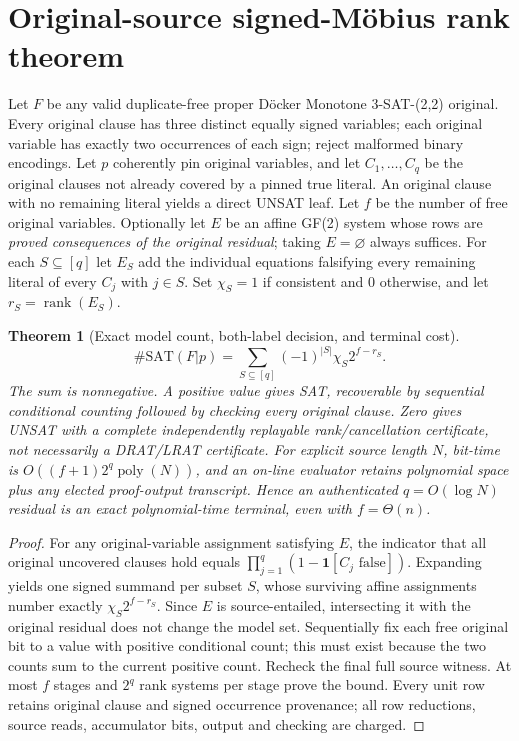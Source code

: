 \documentclass[11pt]{article}
\newtheorem{theorem}{Theorem}
\begin{document}
\section{Original-source signed-M\"obius rank theorem}
Let $F$ be any valid duplicate-free proper D\"ocker Monotone 3-SAT-(2,2) original. Every original clause has three distinct equally signed variables; each original variable has exactly two occurrences of each sign; reject malformed binary encodings. Let $p$ coherently pin original variables, and let $C_1,\dots,C_q$ be the original clauses not already covered by a pinned true literal. An original clause with no remaining literal yields a direct UNSAT leaf. Let $f$ be the number of free original variables. Optionally let $E$ be an affine GF(2) system whose rows are \emph{proved consequences of the original residual}; taking $E=\varnothing$ always suffices. For each $S\subseteq[q]$ let $E_S$ add the individual equations falsifying every remaining literal of every $C_j$ with $j\in S$. Set $\chi_S=1$ if consistent and $0$ otherwise, and let $r_S=\operatorname{rank}(E_S)$.
\begin{theorem}[Exact model count, both-label decision, and terminal cost]
\[
\boxed{\#\mathrm{SAT}(F|p)=\sum_{S\subseteq[q]}(-1)^{|S|}\chi_S2^{f-r_S}.}
\tag{305.1}
\]
The sum is nonnegative. A positive value gives SAT, recoverable by sequential conditional counting followed by checking every original clause. Zero gives UNSAT with a complete independently replayable rank/cancellation certificate, not necessarily a DRAT/LRAT certificate. For explicit source length $N$, bit-time is $O((f+1)2^q\operatorname{poly}(N))$, and an on-line evaluator retains polynomial space plus any elected proof-output transcript. Hence an authenticated $q=O(\log N)$ residual is an exact polynomial-time terminal, even with $f=\Theta(n)$.
\end{theorem}
\begin{proof}
For any original-variable assignment satisfying $E$, the indicator that all original uncovered clauses hold equals $\prod_{j=1}^q(1-\mathbf1[C_j\text{ false}])$. Expanding yields one signed summand per subset $S$, whose surviving affine assignments number exactly $\chi_S2^{f-r_S}$. Since $E$ is source-entailed, intersecting it with the original residual does not change the model set. Sequentially fix each free original bit to a value with positive conditional count; this must exist because the two counts sum to the current positive count. Recheck the final full source witness. At most $f$ stages and $2^q$ rank systems per stage prove the bound. Every unit row retains original clause and signed occurrence provenance; all row reductions, source reads, accumulator bits, output and checking are charged.
\end{proof}
\end{document}
